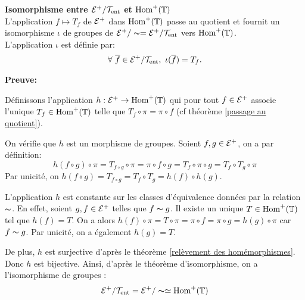 \begin{corollary}\label{isom relation d'équiv sur les homéo}\textbf{Isomorphisme entre $\mathcal{E}^+/\mathcal{T}_{\mathrm{ent}}$ et $\mathrm{Hom}^+({\mathbb{T}})$}\\
	L'application $f\mapsto T_f$ de ${\mathcal{E}}^+$ dans $\mathrm{Hom}^+({\mathbb{T}})$ passe au quotient et fournit un isomorphisme $\iota$ de groupes de ${\mathcal{E}}^+/\thicksim={\mathcal{E}}^+/\mathcal{T}_{\mathrm{ent}}$ vers $\mathrm{Hom}^+({\mathbb{T}})$.\\
	L'application $\iota$ est définie par:
	$$\forall \ \overline{f} \in {\mathcal{E}}^+/\mathcal{T}_{\mathrm{ent}}, \ \iota(\overline{f})= T_f.$$
\end{corollary}


	\textbf{Preuve:}
	\par Définissons l'application $h: {\mathcal{E}}^+ \to \mathrm{Hom}^+({\mathbb{T}})$ qui pour tout $f \in {\mathcal{E}}^+$ associe l'unique $T_f \in \mathrm{Hom}^+({\mathbb{T}})$ telle que $T_f\circ\pi=\pi\circ f$ (cf théorème \ref{passage au quotient}). \\

	\par On vérifie que $h$ est un morphisme de groupes. Soient $f, g \in {\mathcal{E}}^+$, on a par définition:
	$$h(f\circ g)\circ \pi = T_{f\circ g}\circ\pi=\pi\circ f \circ g=T_f\circ\pi\circ g= T_f\circ T_g \circ \pi$$
	Par unicité, on $h(f\circ g)= T_{f\circ g}= T_f \circ T_g=h(f)\circ h(g)$.\\


	\par L'application $h$ est constante sur les classes d'équivalence données par la relation $\thicksim$. En effet, soient $g, f \in {\mathcal{E}}^+$ telles que $f\thicksim g$. Il existe un unique $T \in \mathrm{Hom}^+({\mathbb{T}})$ tel que $h(f)=T$. On a alors $h(f)\circ \pi=T\circ\pi=\pi\circ f = \pi \circ g=h(g)\circ \pi$ car $f \thicksim g$. Par unicité, on a également $h(g)=T$.\\
	\par De plus, $h$ est surjective d'après le théorème \ref{relèvement des homémorphismes}.  Donc $h$ est bijective. Ainsi, d'après le théorème d'isomorphisme, on a l'isomorphisme de groupes :
	 $$\mathcal{E}^+/\mathcal{T}_{\mathrm{ent}} =\mathcal{E}^+/\thicksim \simeq \mathrm{Hom}^+({\mathbb{T}})$$



